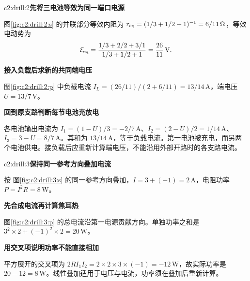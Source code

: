 \begin{drillsolution}{c2:drill:2}\textbf{先将三电池等效为同一端口电源}\par\nobreak
图\ref{fig:c2:drill:2:s} 的并联部分等效内阻为 $r_{\rm eq}=(1/3+1/2+1)^{-1}=6/11\,\Omega$，等效电动势为
\[
 \mathcal E_{\rm eq}=\frac{1/3+2/2+3/1}{1/3+1/2+1}=\frac{26}{11}\,\mathrm V.
\]



\par\medskip{}\noindent\textbf{接入负载后求新的共同端电压}\par\nobreak
图\ref{fig:c2:drill:2:p} 中负载电流 $I_L=(26/11)/(2+6/11)=13/14\,\mathrm A$，端电压 $U=13/7\,\mathrm V$。

\par\medskip{}\noindent\textbf{回到原支路判断每节电池充放电}\par\nobreak
各电池输出电流为 $I_1=(1-U)/3=-2/7\,\mathrm A$、$I_2=(2-U)/2=1/14\,\mathrm A$、$I_3=3-U=8/7\,\mathrm A$。其和为 $13/14\,\mathrm A$，等于负载电流。第一电池被充电，而另两个电池供电。接负载后应重新计算端电压，不能沿用外部开路时的各支路电流。\end{drillsolution}
\begin{drillsolution}{c2:drill:3}\textbf{保持同一参考方向叠加电流}\par\nobreak
按 图\ref{fig:c2:drill:3:s} 的同一参考方向叠加，$I=3+(-1)=2\,\mathrm A$，电阻功率 $P=I^2R=8\,\mathrm W$。



\par\medskip{}\noindent\textbf{先合成电流再计算焦耳热}\par\nobreak
图\ref{fig:c2:drill:3:p} 的总电流沿第一电源贡献方向。单独功率之和是 $3^2\times2+(-1)^2\times2=20\,\mathrm W$。

\par\medskip{}\noindent\textbf{用交叉项说明功率不能直接相加}\par\nobreak
平方展开的交叉项为 $2RI_1I_2=2\times2\times3\times(-1)=-12\,\mathrm W$，故实际功率是 $20-12=8\,\mathrm W$。线性叠加适用于电压与电流，功率须在叠加后重新计算。\end{drillsolution}
